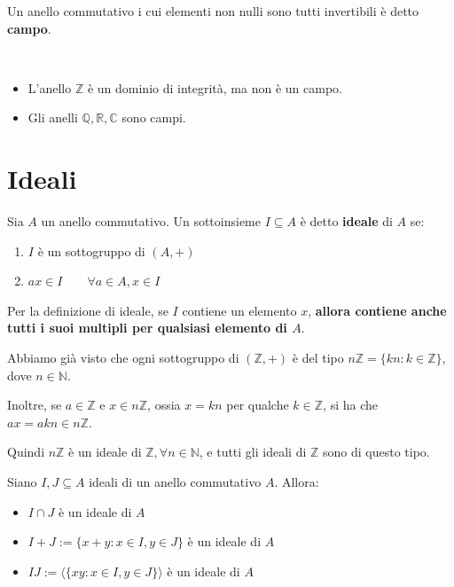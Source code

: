 \documentclass[../main.tex]{subfiles}
\begin{document}
\begin{definition}[Campo]
    Un anello commutativo i cui elementi non nulli sono tutti invertibili è detto \textbf{campo}.
\end{definition}

\begin{example}\
    \begin{itemize}
        \item L'anello $\mathbb{Z}$ è un dominio di integrità, ma non è un campo.
        \item Gli anelli $\mathbb{Q} ,\mathbb{R} ,\mathbb{C} $ sono campi.
    \end{itemize}
\end{example}

\section{Ideali}
\begin{definition}[Ideale]
    Sia $A$ un anello commutativo. Un sottoinsieme $I \subseteq A$ è detto \textbf{ideale} di $A$ se:
    \begin{enumerate}[label=(\roman*)]
        \item $I$ è un sottogruppo di $(A,+)$
        \item $ax \in I \qquad\forall a \in A, x \in I$
    \end{enumerate}
\end{definition}
\begin{note}
    Per la definizione di ideale, se $I$ contiene un elemento $x$, \textbf{allora contiene anche tutti i suoi multipli per qualsiasi elemento di $A$}.
\end{note}

\begin{example}
    Abbiamo già visto che ogni sottogruppo di $(\mathbb{Z} , +)$ è del tipo $n \mathbb{Z} = \{kn : k \in \mathbb{Z} \}$, dove $n \in \mathbb{N}$.

    Inoltre, se $a \in \mathbb{Z} $ e $x \in n\mathbb{Z} $, ossia $x=kn$ per qualche $k \in \mathbb{Z} $, si ha che $ax=akn \in n \mathbb{Z} $.

    Quindi $n \mathbb{Z} $ è un ideale di $\mathbb{Z}, \forall n \in \mathbb{N}  $, e tutti gli ideali di $\mathbb{Z} $ sono di questo tipo.
\end{example}

\begin{remark}
    Siano $I,J \subseteq A$ ideali di un anello commutativo $A$. Allora:
    \begin{itemize}
        \item $I \cap J$ è un ideale di $A$
        \item $I + J := \{x+y : x \in I, y \in J\}$ è un ideale di $A$
        \item $IJ := \langle \{xy : x \in I, y \in J\} \rangle$ è un ideale di $A$
    \end{itemize}
\end{remark}
\end{document}
